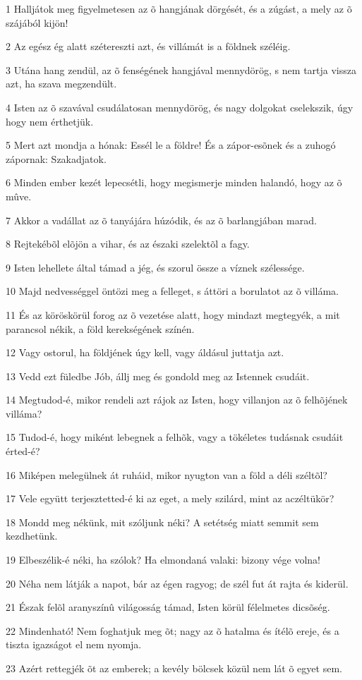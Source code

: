 \par 1 Halljátok meg figyelmetesen az õ hangjának dörgését, és a zúgást, a mely az õ szájából kijön!
\par 2 Az egész ég alatt szétereszti azt, és villámát is a földnek széléig.
\par 3 Utána hang zendül, az õ fenségének hangjával mennydörög, s nem tartja vissza azt, ha szava megzendült.
\par 4 Isten az õ szavával csudálatosan mennydörög, és nagy dolgokat cselekszik, úgy hogy nem érthetjük.
\par 5 Mert azt mondja a hónak: Essél le a földre! És a zápor-esõnek és a zuhogó zápornak: Szakadjatok.
\par 6 Minden ember kezét lepecsétli, hogy megismerje minden halandó, hogy az õ mûve.
\par 7 Akkor a vadállat az õ tanyájára húzódik, és az õ barlangjában marad.
\par 8 Rejtekébõl elõjön a vihar, és az északi szelektõl a fagy.
\par 9 Isten lehellete által támad a jég, és szorul össze a víznek szélessége.
\par 10 Majd nedvességgel öntözi meg a felleget, s áttöri a borulatot az õ villáma.
\par 11 És az köröskörül forog az õ vezetése alatt, hogy mindazt megtegyék, a mit parancsol nékik, a föld kerekségének színén.
\par 12 Vagy ostorul, ha földjének úgy kell, vagy áldásul juttatja azt.
\par 13 Vedd ezt füledbe Jób, állj meg és gondold meg az Istennek csudáit.
\par 14 Megtudod-é, mikor rendeli azt rájok az Isten, hogy villanjon az õ felhõjének villáma?
\par 15 Tudod-é, hogy miként lebegnek a felhõk, vagy a tökéletes tudásnak csudáit érted-é?
\par 16 Miképen melegülnek át ruháid, mikor nyugton van a föld a déli széltõl?
\par 17 Vele együtt terjesztetted-é ki az eget, a mely szilárd, mint az aczéltükör?
\par 18 Mondd meg nékünk, mit szóljunk néki? A setétség miatt semmit sem kezdhetünk.
\par 19 Elbeszélik-é néki, ha szólok? Ha elmondaná valaki: bizony vége volna!
\par 20 Néha nem látják a napot, bár az égen ragyog; de szél fut át rajta és kiderül.
\par 21 Észak felõl aranyszínû világosság támad, Isten körül félelmetes dicsõség.
\par 22 Mindenható! Nem foghatjuk meg õt; nagy az õ hatalma és ítélõ ereje, és a tiszta igazságot el nem nyomja.
\par 23 Azért rettegjék õt az emberek; a kevély bölcsek közül nem lát õ egyet sem.

